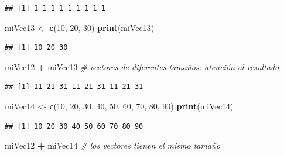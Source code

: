 \documentclass[]{book}
\newenvironment{Shaded}{\begin{snugshade}}{\end{snugshade}}
\newcommand{\KeywordTok}[1]{\textcolor[rgb]{0.13,0.29,0.53}{\textbf{#1}}}
\newcommand{\DecValTok}[1]{\textcolor[rgb]{0.00,0.00,0.81}{#1}}
\newcommand{\StringTok}[1]{\textcolor[rgb]{0.31,0.60,0.02}{#1}}
\newcommand{\CommentTok}[1]{\textcolor[rgb]{0.56,0.35,0.01}{\textit{#1}}}
\newcommand{\OperatorTok}[1]{\textcolor[rgb]{0.81,0.36,0.00}{\textbf{#1}}}
\newcommand{\NormalTok}[1]{#1}
\begin{document}
\begin{verbatim}
## [1] 1 1 1 1 1 1 1 1 1
\end{verbatim}

\begin{Shaded}
\begin{Highlighting}[]
\NormalTok{miVec13 <-}\StringTok{ }\KeywordTok{c}\NormalTok{(}\DecValTok{10}\NormalTok{, }\DecValTok{20}\NormalTok{, }\DecValTok{30}\NormalTok{)}
\KeywordTok{print}\NormalTok{(miVec13)}
\end{Highlighting}
\end{Shaded}

\begin{verbatim}
## [1] 10 20 30
\end{verbatim}

\begin{Shaded}
\begin{Highlighting}[]
\NormalTok{miVec12 }\OperatorTok{+}\StringTok{ }\NormalTok{miVec13 }\CommentTok{# vectores de diferentes tamaños: atención al resultado}
\end{Highlighting}
\end{Shaded}

\begin{verbatim}
## [1] 11 21 31 11 21 31 11 21 31
\end{verbatim}

\begin{Shaded}
\begin{Highlighting}[]
\NormalTok{miVec14 <-}\StringTok{ }\KeywordTok{c}\NormalTok{(}\DecValTok{10}\NormalTok{, }\DecValTok{20}\NormalTok{, }\DecValTok{30}\NormalTok{, }\DecValTok{40}\NormalTok{, }\DecValTok{50}\NormalTok{, }\DecValTok{60}\NormalTok{, }\DecValTok{70}\NormalTok{, }\DecValTok{80}\NormalTok{, }\DecValTok{90}\NormalTok{)}
\KeywordTok{print}\NormalTok{(miVec14)}
\end{Highlighting}
\end{Shaded}

\begin{verbatim}
## [1] 10 20 30 40 50 60 70 80 90
\end{verbatim}

\begin{Shaded}
\begin{Highlighting}[]
\NormalTok{miVec12 }\OperatorTok{+}\StringTok{ }\NormalTok{miVec14 }\CommentTok{# los vectores tienen el mismo tamaño}
\end{Highlighting}
\end{Shaded}
\end{document}
